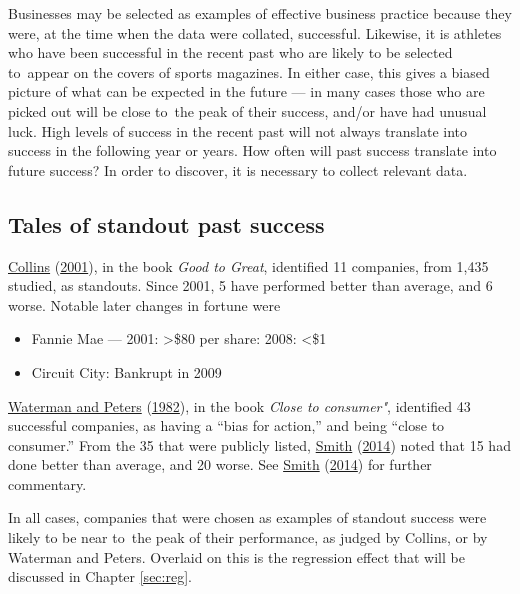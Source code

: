 \documentclass[
  10pt,
  b5paper]{book}
\providecommand{\tightlist}{%
  \setlength{\itemsep}{0pt}\setlength{\parskip}{0pt}}
\begin{document}
Businesses may be selected as examples of effective business
practice because they were, at the time when the data were
collated, successful. Likewise, it is athletes who have
been successful in the recent past who are likely to be
selected to~appear on the covers of sports magazines.
In either case, this gives a biased picture of what can be
expected in the future --- in many cases those who are
picked out will be close to~the peak of their success,
and/or have had unusual luck. High levels of success in
the recent past will not always translate into success
in the following year or years. How often will past
success translate into future success? In order to
discover, it is necessary to collect relevant data.

\hypertarget{tales-of-standout-past-success}{%
\subsection*{Tales of standout past success}\label{tales-of-standout-past-success}}

\protect\hyperlink{ref-collins_2001}{Collins} (\protect\hyperlink{ref-collins_2001}{2001}), in the book \emph{Good to Great}, identified
11 companies, from 1,435 studied, as standouts. Since 2001,
5 have performed better than average, and 6 worse.
Notable later changes in fortune were

\begin{itemize}
\tightlist
\item
  Fannie Mae --- 2001: \textgreater\$80 per share: 2008: \textless\$1
\item
  Circuit City: Bankrupt in 2009
\end{itemize}

\protect\hyperlink{ref-waterman1982search}{Waterman and Peters} (\protect\hyperlink{ref-waterman1982search}{1982}), in the book \emph{Close to consumer"},
identified 43 successful companies, as having a ``bias for action,''
and being ``close to consumer.'' From the 35 that were publicly listed,
\protect\hyperlink{ref-smith-sd}{Smith} (\protect\hyperlink{ref-smith-sd}{2014}) noted that 15 had done better than average, and 20 worse.
See \protect\hyperlink{ref-smith-sd}{Smith} (\protect\hyperlink{ref-smith-sd}{2014}) for further commentary.

In all cases, companies that were chosen as examples of
standout success were likely to be near to~the peak of
their performance, as judged by Collins, or by Waterman and Peters.
Overlaid on this is the regression effect that will be discussed
in Chapter \ref{sec:reg}.
\end{document}
